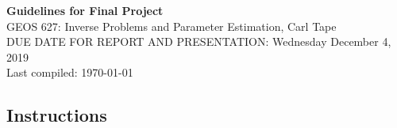 \documentclass[11pt,titlepage,fleqn]{article}
\begin{document}

\begin{center}
{\large \bf Guidelines for Final Project} \\
GEOS 627: Inverse Problems and Parameter Estimation, Carl Tape \\
DUE DATE FOR REPORT AND PRESENTATION: Wednesday December 4, 2019 \\
Last compiled: \today
\end{center}


\subsection*{Instructions}
\end{document}
